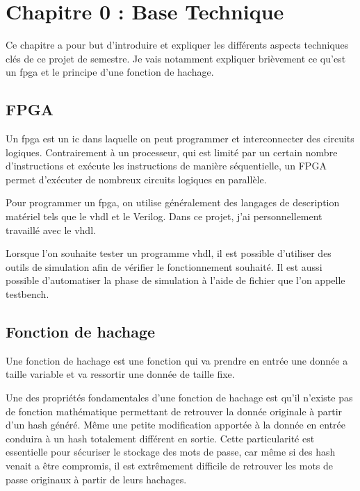 \chapter{Chapitre 0 : Base Technique}

Ce chapitre a pour but d'introduire et expliquer les différents aspects techniques clés de ce projet de semestre. Je vais notamment expliquer brièvement ce qu'est un \gls{fpga} et le principe d'une fonction de hachage.

\section{FPGA}
Un \gls{fpga} est un \gls{ic} dans laquelle on peut programmer et interconnecter des circuits logiques. Contrairement à un processeur, qui est limité par un certain nombre d'instructions et exécute les instructions de manière séquentielle, un FPGA permet d'exécuter de nombreux circuits logiques en parallèle.

Pour programmer un \gls{fpga}, on utilise généralement des langages de description matériel tels que le \gls{vhdl} et le Verilog. Dans ce projet, j'ai personnellement travaillé avec le \gls{vhdl}.

Lorsque l'on souhaite tester un programme \gls{vhdl}, il est possible d'utiliser des outils de simulation afin de vérifier le fonctionnement souhaité. Il est aussi possible d'automatiser la phase de simulation à l'aide de fichier que l'on appelle testbench.

\section{Fonction de hachage}

Une fonction de hachage est une fonction qui va prendre en entrée une donnée a taille variable et va ressortir une donnée de taille fixe. 

Une des propriétés fondamentales d'une fonction de hachage est qu'il n'existe pas de fonction mathématique permettant de retrouver la donnée originale à partir d'un hash généré. Même une petite modification apportée à la donnée en entrée conduira à un hash totalement différent en sortie. Cette particularité est essentielle pour sécuriser le stockage des mots de passe, car même si des hash venait a être compromis, il est extrêmement difficile de retrouver les mots de passe originaux à partir de leurs hachages.

\newpage

